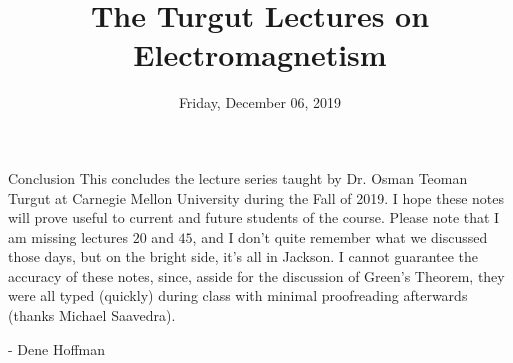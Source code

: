 \documentclass[a4paper, 12pt, twoside]{report}
\title{The Turgut Lectures on Electromagnetism}
\date{Friday, December 06, 2019}
\begin{document}
    \maketitle
    \tableofcontents
    
    
    
    
    
    
    
    
    
    
    
    
    
    
    
    
    
    
    

    
    
    
    
    
    
    
    
    
    
    
    
    
    
    
    
    
    
    
    
    
    
    
    
    

    
    
    
    
    

    \begin{note}{Conclusion}
        This concludes the lecture series taught by Dr. Osman Teoman Turgut at Carnegie Mellon University during the Fall of 2019. I hope these notes will prove useful to current and future students of the course. Please note that I am missing lectures $ 20 $ and $ 45 $, and I don't quite remember what we discussed those days, but on the bright side, it's all in Jackson. I cannot guarantee the accuracy of these notes, since, asside for the discussion of Green's Theorem, they were all typed (quickly) during class with minimal proofreading afterwards (thanks Michael Saavedra).

        - Dene Hoffman
    \end{note}
\end{document}
